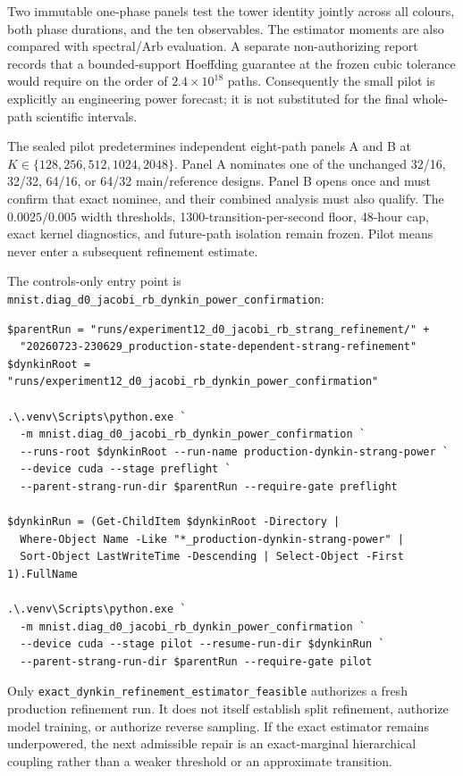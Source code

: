 \documentclass[11pt]{article}
\numberwithin{equation}{section}
\newcommand{\1}{\mathbf 1}
\begin{document}
Two immutable one-phase panels test the tower identity jointly across all
colours, both phase durations, and the ten observables.  The estimator
moments are also compared with spectral/Arb evaluation.  A separate
non-authorizing report records that a bounded-support Hoeffding guarantee
at the frozen cubic tolerance would require on the order of
$2.4\times10^{18}$ paths.  Consequently the small pilot is explicitly an
engineering power forecast; it is not substituted for the final
whole-path scientific intervals.

The sealed pilot predetermines independent eight-path panels A and B at
$K\in\{128,256,512,1024,2048\}$.  Panel A nominates one of the unchanged
32/16, 32/32, 64/16, or 64/32 main/reference designs.  Panel B opens once
and must confirm that exact nominee, and their combined analysis must also
qualify.  The $0.0025/0.005$ width thresholds, 1300-transition-per-second
floor, 48-hour cap, exact kernel diagnostics, and future-path isolation
remain frozen.  Pilot means never enter a subsequent refinement estimate.

The controls-only entry point is
\nolinkurl{mnist.diag_d0_jacobi_rb_dynkin_power_confirmation}:
\begin{Verbatim}[fontsize=\scriptsize,breaklines=true,breakanywhere=true]
$parentRun = "runs/experiment12_d0_jacobi_rb_strang_refinement/" +
  "20260723-230629_production-state-dependent-strang-refinement"
$dynkinRoot = "runs/experiment12_d0_jacobi_rb_dynkin_power_confirmation"

.\.venv\Scripts\python.exe `
  -m mnist.diag_d0_jacobi_rb_dynkin_power_confirmation `
  --runs-root $dynkinRoot --run-name production-dynkin-strang-power `
  --device cuda --stage preflight `
  --parent-strang-run-dir $parentRun --require-gate preflight

$dynkinRun = (Get-ChildItem $dynkinRoot -Directory |
  Where-Object Name -Like "*_production-dynkin-strang-power" |
  Sort-Object LastWriteTime -Descending | Select-Object -First 1).FullName

.\.venv\Scripts\python.exe `
  -m mnist.diag_d0_jacobi_rb_dynkin_power_confirmation `
  --device cuda --stage pilot --resume-run-dir $dynkinRun `
  --parent-strang-run-dir $parentRun --require-gate pilot
\end{Verbatim}

Only \nolinkurl{exact_dynkin_refinement_estimator_feasible} authorizes a
fresh production refinement run.  It does not itself establish split
refinement, authorize model training, or authorize reverse sampling.  If
the exact estimator remains underpowered, the next admissible repair is an
exact-marginal hierarchical coupling rather than a weaker threshold or an
approximate transition.
\end{document}
